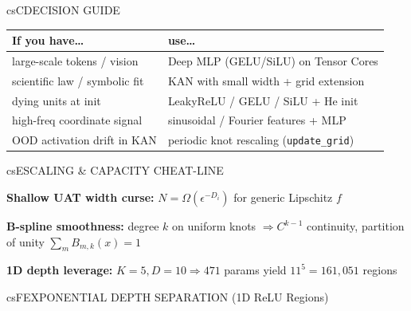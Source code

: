 \documentclass[../../../../master.tex]{subfiles}
\begin{document}
\begin{cscolumns}
\begin{cscard}{csC}{DECISION GUIDE}
  \renewcommand{\arraystretch}{1.22}\small
  \begin{tabular}{@{}>{\raggedright\arraybackslash}p{3.2cm}>{\raggedright\arraybackslash}p{4.6cm}@{}}
    \textbf{If you have\ldots} & \textbf{use\ldots}\\ \hline
    large-scale tokens / vision & Deep MLP (GELU/SiLU) on Tensor Cores\\
    scientific law / symbolic fit & KAN with small width + grid extension\\
    dying units at init & LeakyReLU / GELU / SiLU + He init\\
    high-freq coordinate signal & sinusoidal / Fourier features + MLP\\
    OOD activation drift in KAN & periodic knot rescaling (\texttt{update\_grid})\\
  \end{tabular}
\end{cscard}

\begin{cscard}{csE}{SCALING \& CAPACITY CHEAT-LINE}
  \begin{csbul}
    \item \textbf{Shallow UAT width curse:} $N=\Omega(\epsilon^{-D_i})$ for generic Lipschitz $f$
    \item \textbf{B-spline smoothness:} degree $k$ on uniform knots $\Rightarrow C^{k-1}$ continuity, partition of unity $\sum_m B_{m,k}(x)=1$
    \item \textbf{1D depth leverage:} $K=5, D=10\Rightarrow 471$ params yield $11^5=161{,}051$ regions
  \end{csbul}
\end{cscard}

\begin{cscard}{csF}{EXPONENTIAL DEPTH SEPARATION (1D ReLU Regions)}
  \centering
\end{cscard}
\columnbreak


\end{cscolumns}
\end{document}
